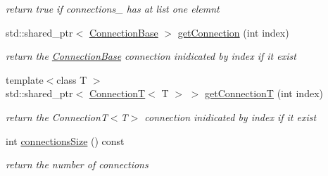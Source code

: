 \begin{DoxyCompactItemize}
\begin{DoxyCompactList}\small\item\em return true if {\ttfamily connections\-\_\-} has at list one elemnt \end{DoxyCompactList}\item 
\hypertarget{classcoco_1_1_connection_manager_aa5765201013d82ff51e6b7d7f25202ea}{std\-::shared\-\_\-ptr$<$ \hyperlink{classcoco_1_1_connection_base}{Connection\-Base} $>$ \hyperlink{classcoco_1_1_connection_manager_aa5765201013d82ff51e6b7d7f25202ea}{get\-Connection} (int index)}\label{classcoco_1_1_connection_manager_aa5765201013d82ff51e6b7d7f25202ea}

\begin{DoxyCompactList}\small\item\em return the \hyperlink{classcoco_1_1_connection_base}{Connection\-Base} connection inidicated by index if it exist \end{DoxyCompactList}\item 
\hypertarget{classcoco_1_1_connection_manager_ae81d9b07af80bebc34b4472b221dea3e}{{\footnotesize template$<$class T $>$ }\\std\-::shared\-\_\-ptr$<$ \hyperlink{classcoco_1_1_connection_t}{Connection\-T}$<$ T $>$ $>$ \hyperlink{classcoco_1_1_connection_manager_ae81d9b07af80bebc34b4472b221dea3e}{get\-Connection\-T} (int index)}\label{classcoco_1_1_connection_manager_ae81d9b07af80bebc34b4472b221dea3e}

\begin{DoxyCompactList}\small\item\em return the Connection\-T$<$\-T$>$ connection inidicated by index if it exist \end{DoxyCompactList}\item 
\hypertarget{classcoco_1_1_connection_manager_aec1d76fc41d101b85442df22fcb6690b}{int \hyperlink{classcoco_1_1_connection_manager_aec1d76fc41d101b85442df22fcb6690b}{connections\-Size} () const }\label{classcoco_1_1_connection_manager_aec1d76fc41d101b85442df22fcb6690b}

\begin{DoxyCompactList}\small\item\em return the number of connections \end{DoxyCompactList}\end{DoxyCompactItemize}
